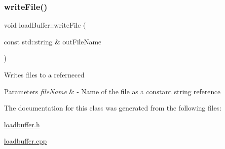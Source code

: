 \mbox{\label{classloadBuffer_a0ebc8576784119627232cff763100695}} 
\subsubsection{\texorpdfstring{write\+File()}{writeFile()}\hspace{0.1cm}{\footnotesize\ttfamily [2/2]}}
{\footnotesize\ttfamily void load\+Buffer\+::write\+File (\begin{DoxyParamCaption}\item[{const std\+::string \&}]{out\+File\+Name }\end{DoxyParamCaption})}

Writes files to a referneced 
\begin{DoxyParams}{Parameters}
{\em file\+Name} & -\/ Name of the file as a constant string reference \\
\hline
\end{DoxyParams}


The documentation for this class was generated from the following files\+:\begin{DoxyCompactItemize}
\item 
\hyperlink{loadbuffer_8h}{loadbuffer.\+h}\item 
\hyperlink{loadbuffer_8cpp}{loadbuffer.\+cpp}\end{DoxyCompactItemize}
